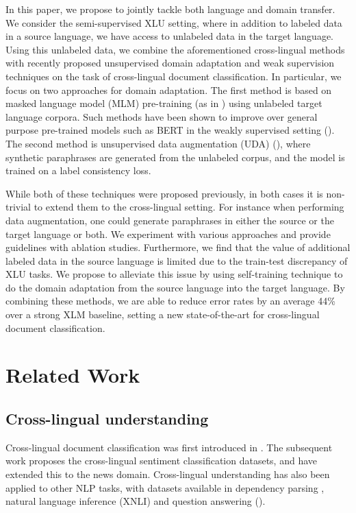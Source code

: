 \documentclass{article} \usepackage{iclr2020_conference,times}
\begin{document}
In this paper, we propose to jointly tackle both language and domain transfer.  
We consider the semi-supervised XLU setting, where in addition to labeled data in a source language, we have access to unlabeled data in the target language.  
Using this unlabeled data, we combine the aforementioned cross-lingual methods with recently proposed unsupervised domain adaptation and weak supervision techniques on the task of cross-lingual document classification.  
In particular, we focus on two approaches for domain adaptation.  The first method is based on masked language model (MLM) pre-training (as in \cite{devlin2018bert}) using unlabeled target language corpora.  
Such methods have been shown to improve over general purpose pre-trained models such as BERT in the weakly supervised setting (\cite{lee2019biobert, han2019unsupervised}).  
The second method is unsupervised data augmentation (UDA) (\cite{xie2019unsupervised}), where synthetic paraphrases are generated from the unlabeled corpus, and the model is trained on a label consistency loss.

While both of these techniques were proposed previously, in both cases it is non-trivial to extend them to the cross-lingual setting.  
For instance when performing data augmentation, one could generate paraphrases in either the source or the target language or both. 
We experiment with various approaches and provide guidelines with ablation studies. 
Furthermore, we find that the value of additional labeled data in the source language is limited due to the train-test discrepancy of XLU tasks. 
We propose to alleviate this issue by using self-training technique to do the domain adaptation from the source language into the target language. 
By combining these methods, we are able to reduce error rates by an average 44\% over a strong XLM baseline, setting a new state-of-the-art for cross-lingual document classification. 
\section{Related Work}

\subsection{Cross-lingual understanding}
Cross-lingual document classification was first introduced in \citep{bel2003cross}.
The subsequent work \citep{prettenhofer2010cross} proposes the cross-lingual sentiment classification datasets, and \citep{lewis2004rcv1, klementiev2012inducing, schwenk2018corpus} have extended this to the news domain.  Cross-lingual understanding has also been applied to other NLP tasks, with datasets available in dependency parsing \citep{nivre2016universal}, natural language inference (XNLI) \citep{conneau2018xnli} and question answering (\cite{liu2019xqa}).
\end{document}
